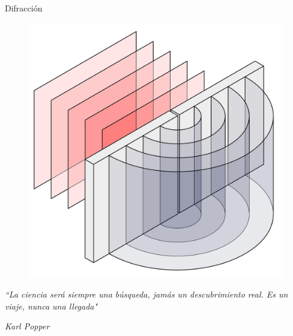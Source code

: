 \documentclass{beamer}
\begin{document}
\begin{frame}{Difracción}
 \begin{figure}
   \centering
   \includegraphics[scale=0.17]{Imagenes/Difraccion_01}
  \end{figure}
\end{frame}

\begin{frame}
\begin{center}
\Huge 
\textit{``La ciencia será siempre una búsqueda, jamás un descubrimiento real. Es un viaje, nunca una llegada"}
\end{center}
\begin{flushright}
\small
\textit{Karl Popper}
\end{flushright}
\end{frame}
\end{document}

